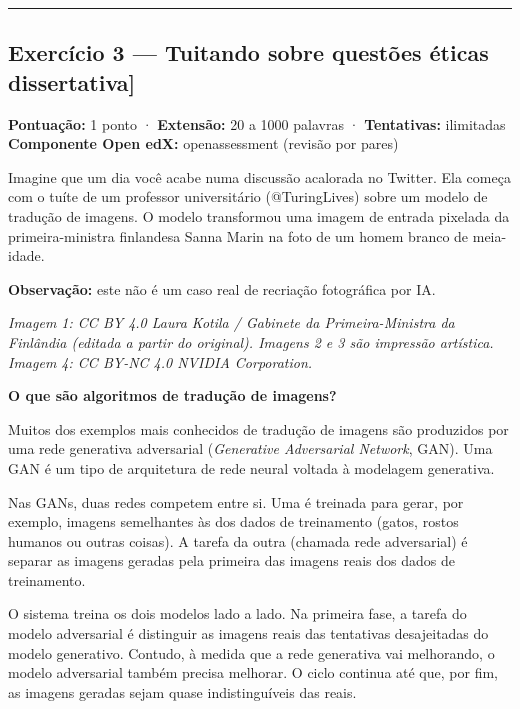 \documentclass[
  11pt,
]{article}
\renewcommand{\texttt}[1]{{\color{iaAmeixa}\small\ttfamily #1}}
\begin{document}
\begin{center}\rule{0.5\linewidth}{0.5pt}\end{center}

\hypertarget{exercuxedcio-3-tuitando-sobre-questuxf5es-uxe9ticas-dissertativa}{%
\subsection{\texorpdfstring{Exercício 3 --- Tuitando sobre questões
éticas
\texttt{{[}dissertativa{]}}}{Exercício 3 --- Tuitando sobre questões éticas {[}dissertativa{]}}}\label{exercuxedcio-3-tuitando-sobre-questuxf5es-uxe9ticas-dissertativa}}

\textbf{Pontuação:} 1 ponto · \textbf{Extensão:} 20 a 1000 palavras ·
\textbf{Tentativas:} ilimitadas \textbf{Componente Open edX:}
\texttt{openassessment} (revisão por pares)

Imagine que um dia você acabe numa discussão acalorada no Twitter. Ela
começa com o tuíte de um professor universitário (@TuringLives) sobre um
modelo de tradução de imagens. O modelo transformou uma imagem de
entrada pixelada da primeira-ministra finlandesa Sanna Marin na foto de
um homem branco de meia-idade.

\textbf{Observação:} este não é um caso real de recriação fotográfica
por IA.

\emph{Imagem 1: CC BY 4.0 Laura Kotila / Gabinete da Primeira-Ministra
da Finlândia (editada a partir do original). Imagens 2 e 3 são impressão
artística. Imagem 4: CC BY-NC 4.0 NVIDIA Corporation.}

\textbf{O que são algoritmos de tradução de imagens?}

Muitos dos exemplos mais conhecidos de tradução de imagens são
produzidos por uma rede generativa adversarial (\emph{Generative
Adversarial Network}, GAN). Uma GAN é um tipo de arquitetura de rede
neural voltada à modelagem generativa.

Nas GANs, duas redes competem entre si. Uma é treinada para gerar, por
exemplo, imagens semelhantes às dos dados de treinamento (gatos, rostos
humanos ou outras coisas). A tarefa da outra (chamada rede adversarial)
é separar as imagens geradas pela primeira das imagens reais dos dados
de treinamento.

O sistema treina os dois modelos lado a lado. Na primeira fase, a tarefa
do modelo adversarial é distinguir as imagens reais das tentativas
desajeitadas do modelo generativo. Contudo, à medida que a rede
generativa vai melhorando, o modelo adversarial também precisa melhorar.
O ciclo continua até que, por fim, as imagens geradas sejam quase
indistinguíveis das reais.
\end{document}
